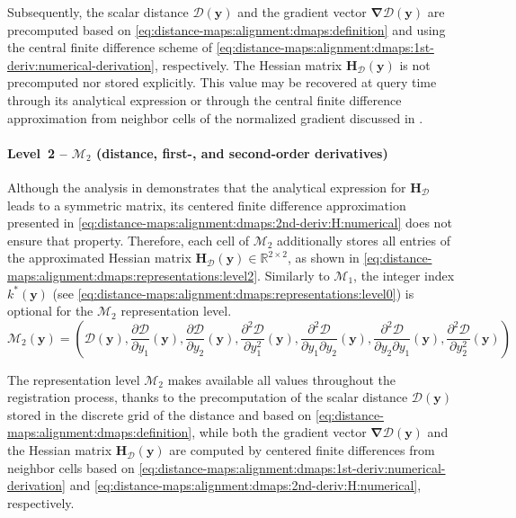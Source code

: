 Subsequently, the scalar distance $\mathcal{D}(\mathbf{y})$ and
the gradient vector $\bm{\nabla}\mathcal{D}(\mathbf{y})$ are precomputed
based on \eqref{eq:distance-maps:alignment:dmaps:definition} and using the
central finite difference scheme of
\eqref{eq:distance-maps:alignment:dmaps:1st-deriv:numerical-derivation},
respectively.
The Hessian matrix $\mathbf{H}_{\mathcal{D}}(\mathbf{y})$ is not precomputed nor
stored explicitly. This value may be recovered at query time through its
analytical expression or through the central finite difference approximation
from neighbor cells of the normalized gradient discussed in
.

\paragraph{Level~2 -- $\mathcal{M}_2$
(distance, first-, and second-order derivatives)}
Although the analysis in 
demonstrates that the analytical expression for $\mathbf{H}_{\mathcal{D}}$
leads to a symmetric matrix, its centered finite difference approximation
presented in \eqref{eq:distance-maps:alignment:dmaps:2nd-deriv:H:numerical} does
not ensure that property.
Therefore, each cell of $\mathcal{M}_2$ additionally stores
all entries of the approximated Hessian matrix
$\mathbf{H}_{\mathcal{D}}(\mathbf{y})\in\mathbb{R}^{2\times2}$, as shown in
\eqref{eq:distance-maps:alignment:dmaps:representations:level2}.
Similarly to $\mathcal{M}_1$, the integer index $k^*(\mathbf{y})$
(see \eqref{eq:distance-maps:alignment:dmaps:representations:level0})
is optional for the $\mathcal{M}_2$ representation level.
\begin{equation}
\label{eq:distance-maps:alignment:dmaps:representations:level2}
\mathcal{M}_2(\mathbf{y}) =
\left(
    \mathcal{D}(\mathbf{y}),
    \frac{\partial \mathcal{D}}{\partial y_1}(\mathbf{y}),
    \frac{\partial \mathcal{D}}{\partial y_2}(\mathbf{y}),
    \frac{\partial^2 \mathcal{D}}{\partial y_1^2}(\mathbf{y}),
    \frac{\partial^2 \mathcal{D}}{\partial y_1 \partial y_2}(\mathbf{y}),
    \frac{\partial^2 \mathcal{D}}{\partial y_2 \partial y_1}(\mathbf{y}),
    \frac{\partial^2 \mathcal{D}}{\partial y_2^2}(\mathbf{y})
\right)
\end{equation}

The representation level $\mathcal{M}_2$ makes available all values throughout
the registration process, thanks to the precomputation of the scalar distance
$\mathcal{D}(\mathbf{y})$ stored in the discrete grid of the distance and based
on \eqref{eq:distance-maps:alignment:dmaps:definition}, while both the
gradient vector $\bm{\nabla}\mathcal{D}(\mathbf{y})$ and the Hessian matrix
$\mathbf{H}_{\mathcal{D}}(\mathbf{y})$ are computed by centered finite
differences from neighbor cells based on
\eqref{eq:distance-maps:alignment:dmaps:1st-deriv:numerical-derivation} and
\eqref{eq:distance-maps:alignment:dmaps:2nd-deriv:H:numerical}, respectively.

